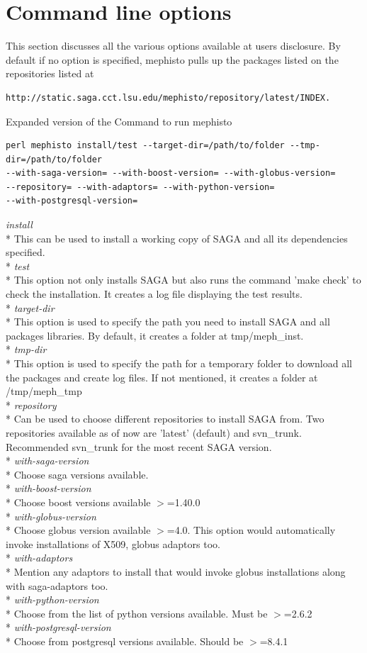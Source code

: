 \documentclass[a4paper,10pt]{article}
\begin{document}
\section*{Command line options}
This section discusses all the various options available at 
users disclosure. By default if no option is specified, mephisto 
pulls up the packages listed on the repositories listed at
\begin{verbatim} 
http://static.saga.cct.lsu.edu/mephisto/repository/latest/INDEX. 
\end{verbatim}
Expanded version of the Command to run mephisto
\begin{verbatim} 
perl mephisto install/test --target-dir=/path/to/folder --tmp-dir=/path/to/folder 
--with-saga-version= --with-boost-version= --with-globus-version= 
--repository= --with-adaptors= --with-python-version= 
--with-postgresql-version=
\end{verbatim} 
\emph{install} \\*
 This can be used to install a working copy of SAGA and all its 
 dependencies specified. \\*
\emph{test} \\*
 This option not only installs SAGA but also runs the command 
 'make check' to check the installation. It creates a log file displaying 
 the test results. \\*
\emph{target-dir} \\*
 This option is used to specify the path you need to install SAGA and all 
 packages libraries. By default, it creates a folder at tmp/meph\_inst.\\*
\emph{tmp-dir} \\*
 This option is used to specify the path for a temporary folder to 
 download all the packages and create log files. If not mentioned, it 
 creates a folder at /tmp/meph\_tmp\\*
\emph{repository} \\*
 Can be used to choose different repositories to install SAGA from. 
 Two repositories available as of now are 'latest' (default) and svn\_trunk. 
 Recommended svn\_trunk for the most recent SAGA version. \\*
\emph{with-saga-version}\\*
 Choose saga versions available.\\*
\emph{with-boost-version}\\*
Choose boost versions available $>$=1.40.0\\*
\emph{with-globus-version} \\*
 Choose globus version available $>$=4.0. This option would automatically 
 invoke installations of X509, globus adaptors too. \\*
\emph{with-adaptors}\\*
 Mention any adaptors to install that would invoke globus installations along with 
 saga-adaptors too. \\*
 \emph{with-python-version}\\*
 Choose from the list of python versions available. Must be 
 $>$=2.6.2 \\*
 \emph{with-postgresql-version}\\*
 Choose from postgresql versions available. Should be $>$=8.4.1
\end{document}
